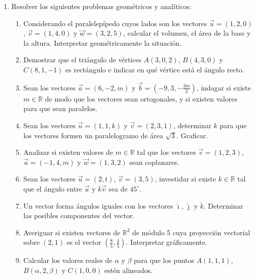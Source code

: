 \documentclass[a4paper]{article}
\newcommand{\exercise}{\item}
\newcommand{\df}[2]{\displaystyle\frac{#1}{#2}}
\newcommand{\degs}{^{\circ}}
\begin{document}
\begin{enumerate}
\begin{enumerate} [label=(\alph*)]
		\item El volumen del parallelepípedo cuyos lados son los vectores $\vec{a}=(3,1,2)$, $\vec{b}=(4,5,1)$ y $\vec{c}=(1,2,4)$
		\item Si los vectores $\vec{r}=(-1,-2,1)$, $\vec{s}=(3,0,-2)$ y $\vec{t}=(5,-4,0)$ son coplanares
		\item Si los puntos $A(0,0,0)$, $B(5,-2,1)$, $C(4,-1,1)$ y $D(1,-1,0)$ son coplanares
		\item Si alguno de los vectores $\vec{a}=(4,-8,1)$, $\vec{b}=(2,1,-2)$, $\vec{c}=(3,-4,12)$ es combinación lineal de los otros dos
	\end{enumerate}
	\exercise Resolver los siguientes problemas geométricos y analíticos:
	\begin{enumerate} [label=(\alph*)]
		\item Considerando el paralelepípedo cuyos lados son los vectores $\vec{u}=(1,2,0)$, $\vec{v}=(1,4,0)$ y $\vec{w}=(3,2,5)$, calcular el volumen, el área de la base y la altura. Interpretar geométricamente la situación.
		\item Demostrar que el triángulo de vértices $A(3,0,2)$, $B(4,3,0)$ y $C(8,1,-1)$ es rectángulo e indicar en qué vértice está el ángulo recto.
		\item Sean los vectores $\vec{a}=(6,-2,m)$ y $\vec{b}=\left(-9,3,-\df{3m}{2}\right)$, indagar si existe $m \in \mathbb{R}$ de modo que los vectores sean ortogonales, y si existen valores para que sean paralelos.
		\item Sean los vectores $\vec{u}=(1,1,k)$ y $\vec{v}=(2,3,1)$, determinar $k$ para que los vectores formen un paralelogramo de área $\sqrt{3}$. Graficar.
		\item Analizar si existen valores de $m \in \mathbb{R}$ tal que los vectores $\vec{v}=(1,2,3)$, $\vec{u}=(-1,4,m)$ y $\vec{w}=(1,3,2)$ sean coplanares.
		\item Sean los vectores $\vec{u}=(2,t)$, $\vec{v}=(3,5)$, investidar si existe $k \in \mathbb{R}$ tal que el ángulo entre $\vec{u}$ y $k\vec{v}$ sea de $45\degs$.
		\item Un vector forma ángulos iguales con los vectores $\check{\imath}$, $\check{\jmath}$ y $\check{k}$. Determinar las posibles componentes del vector.
		\item Averiguar si existen vectores de $\mathbb{R}^2$ de módulo 5 cuya proyección vectorial sobre $(2,1)$ es el vector $\left(\df{8}{5},\df{4}{5}\right)$. Interpretar gráficamente.
		\item Calcular los valores reales de $\alpha$ y $\beta$ para que los puntos $A(1,1,1)$, $B(\alpha,2,\beta)$ y $C(1,0,0)$ estén alineados.

\end{enumerate}
\end{enumerate}
\end{document}
